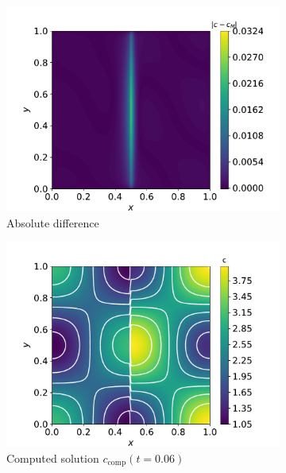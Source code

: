 \begin{figure}
\begin{subfigure}{0.33\linewidth}
        \centering
        \includegraphics[width=\linewidth]{Figures/Chapter3/monoblocks/interface_condition/diff_t0.01.pdf}
        \caption{Absolute difference}
    \end{subfigure}
    \begin{subfigure}{0.33\linewidth}
        \centering
        \includegraphics[width=\linewidth]{Figures/Chapter3/monoblocks/interface_condition/u_computed_t0.06.pdf}
        \caption{Computed solution $c_\mathrm{comp}(t=0.06)$}
    \end{subfigure}%
    \begin{subfigure}{0.33\linewidth}
        \centering

\end{subfigure}
\end{figure}
